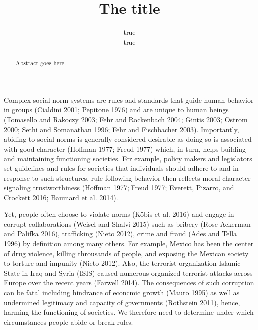 \documentclass[man]{apa6}
\title{The title}
\author{true \\ true}
\date{}
\newenvironment{Shaded}{\begin{snugshade}}{\end{snugshade}}
\newcommand{\CommentTok}[1]{\textcolor[rgb]{0.56,0.35,0.01}{\textit{#1}}}
\newcommand{\DataTypeTok}[1]{\textcolor[rgb]{0.13,0.29,0.53}{#1}}
\newcommand{\DecValTok}[1]{\textcolor[rgb]{0.00,0.00,0.81}{#1}}
\newcommand{\KeywordTok}[1]{\textcolor[rgb]{0.13,0.29,0.53}{\textbf{#1}}}
\newcommand{\NormalTok}[1]{#1}
\newcommand{\OperatorTok}[1]{\textcolor[rgb]{0.81,0.36,0.00}{\textbf{#1}}}
\begin{document}
\maketitle
\begin{abstract}
Abstract goes here.
\end{abstract}

\begin{Shaded}
\end{Shaded}

Complex social norm systems are rules and standards that guide human
behavior in groups (Cialdini 2001; Pepitone 1976) and are unique to
human beings (Tomasello and Rakoczy 2003; Fehr and Rockenbach 2004;
Gintis 2003; Ostrom 2000; Sethi and Somanathan 1996; Fehr and
Fischbacher 2003). Importantly, abiding to social norms is generally
considered desirable as doing so is associated with good character
(Hoffman 1977; Freud 1977) which, in turn, helps building and
maintaining functioning societies. For example, policy makers and
legislators set guidelines and rules for societies that individuals
should adhere to and in response to such structures, rule-following
behavior then reflects moral character signaling trustworthiness
(Hoffman 1977; Freud 1977; Everett, Pizarro, and Crockett 2016; Baumard
et al. 2014).

Yet, people often choose to violate norms (Köbis et al. 2016) and engage
in corrupt collaborations (Weisel and Shalvi 2015) such as bribery
(Rose-Ackerman and Palifka 2016), trafficking (Nieto 2012), crime and
fraud (Ades and Tella 1996) by definition among many others. For
example, Mexico has been the center of drug violence, killing throusands
of people, and exposing the Mexican society to torture and impunity
(Nieto 2012). Also, the terrorist organization Islamic State in Iraq and
Syria (ISIS) caused numerous organized terrorist attacks across Europe
over the recent years (Farwell 2014). The consequences of such
corruption can be fatal including hindrance of economic growth (Mauro
1995) as well as undermined legitimacy and capacity of governments
(Rothstein 2011), hence, harming the functioning of societies. We
therefore need to determine under which circumstances people abide or
break rules.
\end{document}
